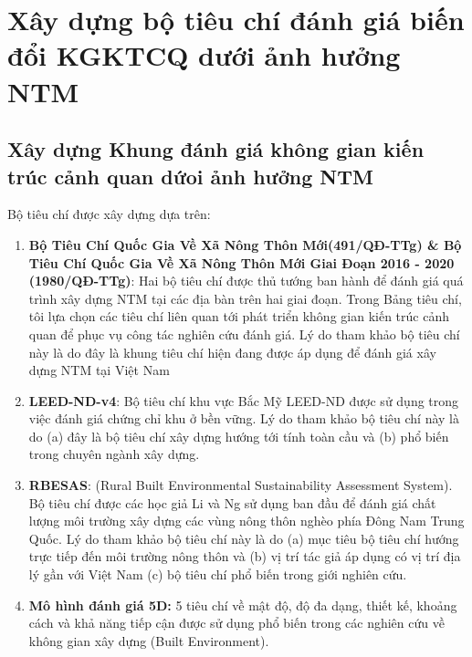 \documentclass[../thesis.tex]{subfiles}
\begin{document}
\section {Xây dựng bộ tiêu chí đánh giá biến đổi KGKTCQ dưới ảnh hưởng NTM}
\subsection {Xây dựng Khung đánh giá không gian kiến trúc cảnh quan dứoi ảnh hưởng NTM}
Bộ tiêu chí được xây dựng dựa trên:
\begin{enumerate}
    \item \textbf{Bộ Tiêu Chí Quốc Gia Về Xã Nông Thôn Mới(491/QĐ-TTg) \& Bộ Tiêu Chí Quốc Gia Về Xã Nông Thôn Mới Giai Đoạn 2016 - 2020 (1980/QĐ-TTg)}: Hai bộ tiêu chí được thủ tướng ban hành để đánh giá quá trình xây dựng NTM tại các địa bàn trên hai giai đoạn. Trong Bảng tiêu chí, tôi lựa chọn các tiêu chí liên quan tới phát triển không gian kiến trúc cảnh quan để phục vụ công tác nghiên cứu đánh giá. Lý do tham khảo bộ tiêu chí này là do đây là khung tiêu chí hiện đang được áp dụng để đánh giá xây dựng NTM tại Việt Nam
    \item \textbf{LEED-ND-v4\cite{leed_v4}}: Bộ tiêu chí khu vực Bắc Mỹ LEED-ND được sử dụng trong việc đánh giá chứng chỉ khu ở bền vững. Lý do tham khảo bộ tiêu chí này là do (a) đây là bộ tiêu chí xây dựng hướng tới tính toàn cầu và (b) phổ biến trong chuyên ngành xây dựng.
    \item \textbf{RBESAS\cite{wan_ng_2016}}: (Rural Built Environmental Sustainability Assessment System). Bộ tiêu chí được các học giả Li và Ng sử dụng ban đầu để đánh giá chất lượng môi trường xây dựng các vùng nông thôn nghèo phía Đông Nam Trung Quốc. Lý do tham khảo bộ tiêu chí này là do (a) mục tiêu bộ tiêu chí hướng trực tiếp đến môi trường nông thôn và (b) vị trí tác giả áp dụng có vị trí địa lý gần với Việt Nam (c) bộ tiêu chí phổ biến trong giới nghiên cứu. 
    \item \textbf{Mô hình đánh giá 5D:\cite{ao_martek_2020}} 5 tiêu chí về mật độ, độ đa dạng, thiết kế, khoảng cách và khả năng tiếp cận được sử dụng phổ biến trong các nghiên cứu về không gian xây dựng (Built Environment). 
\end{enumerate}
\end{document}
